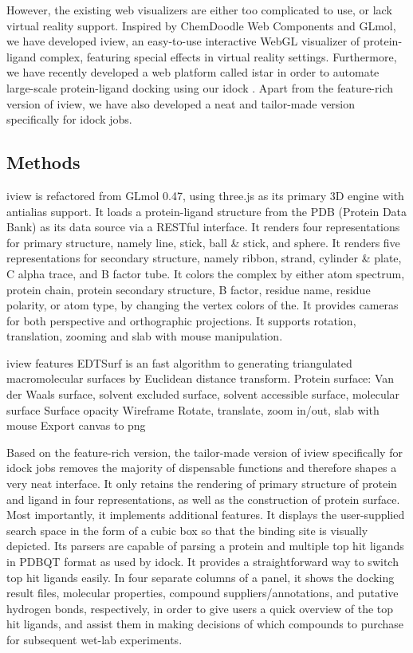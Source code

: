 \documentclass{bioinfo}
\begin{document}
However, the existing web visualizers are either too complicated to use, or lack virtual reality support. Inspired by ChemDoodle Web Components and GLmol, we have developed iview, an easy-to-use interactive WebGL visualizer of protein-ligand complex, featuring special effects in virtual reality settings. Furthermore, we have recently developed a web platform called istar in order to automate large-scale protein-ligand docking using our idock \citep{1153}. Apart from the feature-rich version of iview, we have also developed a neat and tailor-made version specifically for idock jobs.


\begin{methods}
\section{Methods}

iview is refactored from GLmol 0.47, using three.js as its primary 3D engine with antialias support. It loads a protein-ligand structure from the PDB (Protein Data Bank) \citep{539,537} as its data source via a RESTful interface. It renders four representations for primary structure, namely line, stick, ball \& stick, and sphere. It renders five representations for secondary structure, namely ribbon, strand, cylinder \& plate, C alpha trace, and B factor tube. It colors the complex by either atom spectrum, protein chain, protein secondary structure, B factor, residue name, residue polarity, or atom type, by changing the vertex colors of the. It provides cameras for both perspective and orthographic projections. It supports rotation, translation, zooming and slab with mouse manipulation.

iview features EDTSurf \citep{1297} is an fast algorithm to generating triangulated macromolecular surfaces by Euclidean distance transform.
Protein surface: Van der Waals surface, solvent excluded surface, solvent accessible surface, molecular surface 
Surface opacity
Wireframe
Rotate, translate, zoom in/out, slab with mouse
Export canvas to png

Based on the feature-rich version, the tailor-made version of iview specifically for idock jobs removes the majority of dispensable functions and therefore shapes a very neat interface. It only retains the rendering of primary structure of protein and ligand in four representations, as well as the construction of protein surface. Most importantly, it implements additional features. It displays the user-supplied search space in the form of a cubic box so that the binding site is visually depicted. Its parsers are capable of parsing a protein and multiple top hit ligands in PDBQT format as used by idock. It provides a straightforward way to switch top hit ligands easily. In four separate columns of a panel, it shows the docking result files, molecular properties, compound suppliers/annotations, and putative hydrogen bonds, respectively, in order to give users a quick overview of the top hit ligands, and assist them in making decisions of which compounds to purchase for subsequent wet-lab experiments.


\end{methods}
\end{document}
